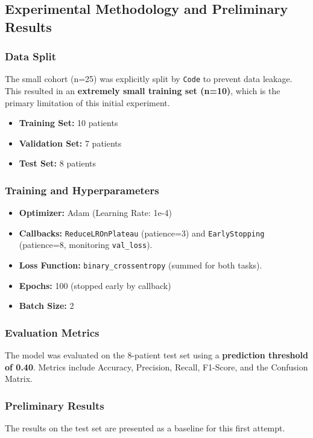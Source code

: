 \subsection{Experimental Methodology and Preliminary Results}

\subsubsection{Data Split}
The small cohort (n=25) was explicitly split by \texttt{Code} to prevent data leakage. This resulted in an \textbf{extremely small training set (n=10)}, which is the primary limitation of this initial experiment.
\begin{itemize}
    \item \textbf{Training Set:} 10 patients
    \item \textbf{Validation Set:} 7 patients
    \item \textbf{Test Set:} 8 patients
\end{itemize}

\subsubsection{Training and Hyperparameters}
\begin{itemize}
    \item \textbf{Optimizer:} Adam (Learning Rate: 1e-4)
    \item \textbf{Callbacks:} \texttt{ReduceLROnPlateau} (patience=3) and \texttt{EarlyStopping} (patience=8, monitoring \texttt{val\_loss}).
    \item \textbf{Loss Function:} \texttt{binary\_crossentropy} (summed for both tasks).
    \item \textbf{Epochs:} 100 (stopped early by callback)
    \item \textbf{Batch Size:} 2
\end{itemize}

\subsubsection{Evaluation Metrics}
The model was evaluated on the 8-patient test set using a \textbf{prediction threshold of 0.40}. Metrics include Accuracy, Precision, Recall, F1-Score, and the Confusion Matrix.

\subsubsection{Preliminary Results}
The results on the test set are presented as a baseline for this first attempt.

